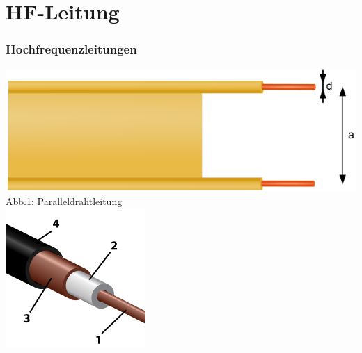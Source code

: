 

\subtitle{Technik Klasse A 10: \\
          HF-Leitungen \& Kabel \\[2em]}
\date{Stand 03.06.2016}



\section*{HF-Leitung}
\begin{frame}
  \frametitle{Hochfrequenzleitungen}
  \begin{center}
    \includegraphics[width=\textwidth,height=.35\textheight,keepaspectratio]{a10/parallel.png}\\
    {\tiny Abb.1: Paralleldrahtleitung \cite{wp}}
    \\
    \includegraphics[width=\textwidth,height=.35\textheight,keepaspectratio]{a10/coax.png}\\

\end{center}
\end{frame}
